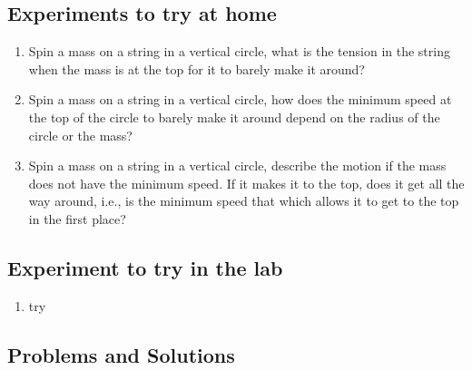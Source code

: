 \subsection{Experiments to try at home}

\begin{enumerate}
\item Spin a mass on a string in a vertical circle, what is the tension in the string when the mass is at the top for it to barely make it around?
\item Spin a mass on a string in a vertical circle, how does the minimum speed at the top of the circle to barely make it around  depend on the radius of the circle or the mass?
\item Spin a mass on a string in a vertical circle, describe the motion if the mass does not have the minimum speed. If it makes it to the top, does it get all the way around, i.e., is the minimum speed that which allows it to get to the top in the first place?
\end{enumerate}
\subsection{Experiment to try in the lab}
\begin{enumerate}
\item try
\end{enumerate}

\subsection{Problems and Solutions}
